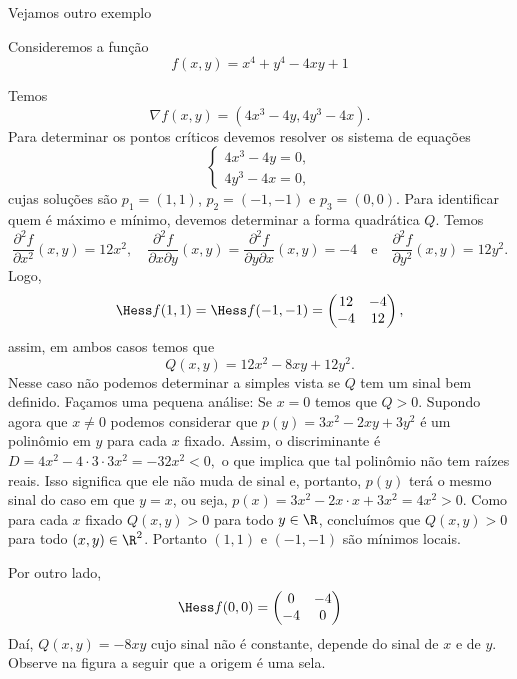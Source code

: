 \pagebreak
Vejamos outro exemplo
\begin{example}{}{}
Consideremos a função
\begin{equation}\label{ilust_locais}
    f(x,y)=x^4+y^4 -4xy + 1
\end{equation} 

Temos
$$\nabla f (x,y) = (4x^3-4y,4y^3-4x).$$
Para determinar os pontos críticos devemos resolver os sistema de equações
$$\begin{cases}
    4x^3-4y=0,\\
    4y^3-4x=0,
\end{cases}$$
cujas soluções são $p_1=(1,1)$, $p_2=(-1,-1)$ e $p_3=(0,0)$. Para identificar quem é máximo e mínimo, devemos determinar a forma quadrática $Q$.
Temos 
$$\dfrac{\partial^2 f }{\partial x^2}(x,y)=12x^2,\quad 
\dfrac{\partial^2 f }{\partial x\partial y}(x,y)=\dfrac{\partial^2 f }{\partial y\partial x}(x,y)=-4 
\quad \mbox{e} \quad \dfrac{\partial^2 f }{\partial y^2}(x,y)=12 y^2.$$
Logo,
$$\Hess f(1,1)= \Hess f(-1,-1)=
\begin{pmatrix}
    12&-4\\
    -4&12
\end{pmatrix},$$
assim, em ambos casos temos que 
$$Q(x,y)=12x^2-8xy+12y^2.$$
Nesse caso não podemos determinar a simples vista se $Q$ tem um sinal bem definido. Façamos uma pequena análise:
Se $x=0$ temos que $Q>0$. Supondo agora que $x\neq 0 $ 
podemos considerar que $p(y)=3x^2-2xy+3y^2$ é um  polinômio em $y$ para cada $x$ fixado. Assim, o discriminante é 
$D= 4x^2 -4 \cdot 3 \cdot 3x^2 =-32 x^2<0,$ o que implica que tal polinômio não tem raízes reais. Isso significa que ele não muda de sinal e, portanto, $p(y)$ terá o mesmo sinal do caso em que $y=x$, ou seja, $p(x)=3x^2-2x\cdot x+3x^2=4x^2>0$. Como para cada $x$ fixado $Q(x,y)>0$ para todo $y\in\R$, concluímos que $Q(x,y)>0$ para todo $(x,y)\in\R^2$. Portanto $(1,1)$ e $(-1,-1)$ são mínimos locais. 

\medskip 

Por outro lado, 
$$\Hess f(0,0)= 
\begin{pmatrix}
    0&-4\\
    -4&0
\end{pmatrix}$$
Daí, 
$Q(x,y)=-8xy$ cujo sinal não é constante, depende do sinal de $x$ e de $y$. Observe na figura a seguir que a origem é uma sela. 



\end{example}
